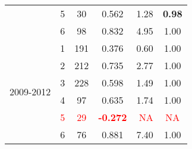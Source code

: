 \begin{table}
\begin{tabular}{rrcrrr}
    \multicolumn{1}{c}{} & \multicolumn{1}{c}{5} & \multicolumn{1}{c}{30} & \multicolumn{1}{c}{0.562 } & \multicolumn{1}{r}{1.28 } & \multicolumn{1}{c}{\textbf{0.98}} \\
    \multicolumn{1}{c}{} & \multicolumn{1}{c}{6} & \multicolumn{1}{c}{98} & \multicolumn{1}{c}{0.832 } & \multicolumn{1}{r}{4.95 } & \multicolumn{1}{c}{1.00 } \\\midrule
    \multicolumn{1}{c}{\multirow{6}[2]{*}{\begin{sideways}2009-2012\end{sideways}}} & \multicolumn{1}{c}{1} & \multicolumn{1}{c}{191} & \multicolumn{1}{c}{0.376 } & \multicolumn{1}{r}{0.60 } & \multicolumn{1}{c}{1.00 } \\
    \multicolumn{1}{c}{} & \multicolumn{1}{c}{2} & \multicolumn{1}{c}{212} & \multicolumn{1}{c}{0.735 } & \multicolumn{1}{r}{2.77 } & \multicolumn{1}{c}{1.00 } \\
    \multicolumn{1}{c}{} & \multicolumn{1}{c}{3} & \multicolumn{1}{c}{228} & \multicolumn{1}{c}{0.598 } & \multicolumn{1}{r}{1.49 } & \multicolumn{1}{c}{1.00 } \\
    \multicolumn{1}{c}{} & \multicolumn{1}{c}{4} & \multicolumn{1}{c}{97} & \multicolumn{1}{c}{0.635 } & \multicolumn{1}{r}{1.74 } & \multicolumn{1}{c}{1.00 } \\
    \multicolumn{1}{c}{} & \multicolumn{1}{c}{\textcolor{red}{5}} & \multicolumn{1}{c}{\textcolor{red}{29}} & \multicolumn{1}{c}{\textcolor{red}{\textbf{-0.272 }}} & \multicolumn{1}{r}{\textcolor{red}{NA}} & \multicolumn{1}{c}{\textcolor{red}{NA}} \\
    \multicolumn{1}{c}{} & \multicolumn{1}{c}{6} & \multicolumn{1}{c}{76} & \multicolumn{1}{c}{0.881 } & \multicolumn{1}{r}{7.40 } & \multicolumn{1}{c}{1.00 } \\
    \bottomrule
    \end{tabular}%
  \label{tab:NO3SWPHPA}%
\end{table}%
